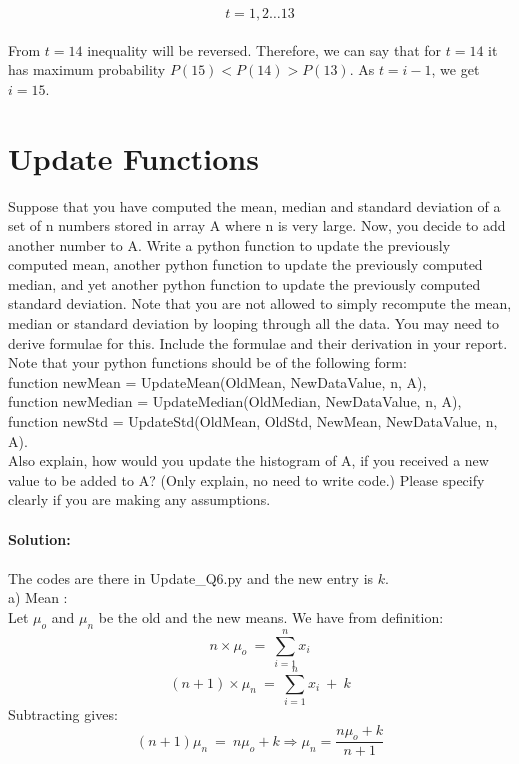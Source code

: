 \documentclass[12pt]{article}
\begin{document}
\[
t = 1,2 \dots 13
\]
\\
From $t=14$ inequality will be reversed.
Therefore, we can say that for $t = 14$ it has maximum probability $P(15) < P(14) > P(13)$.
As $t = i-1$, we get $i = 15$.

\newpage
\section{Update Functions}
Suppose that you have computed the mean, median and standard deviation of a set of n numbers
stored in array A where n is very large. Now, you decide to add another number to A. Write a
python function to update the previously computed mean, another python function to update the
previously computed median, and yet another python function to update the previously computed
standard deviation. Note that you are not allowed to simply recompute the mean, median or
standard deviation by looping through all the data. You may need to derive formulae for this.
Include the formulae and their derivation in your report. Note that your python functions should
be of the following form: \\
function newMean = UpdateMean(OldMean, NewDataValue, n, A), \\
function newMedian = UpdateMedian(OldMedian, NewDataValue, n, A),\\
function newStd = UpdateStd(OldMean, OldStd, NewMean, NewDataValue, n, A).\\
Also explain, how would you update the histogram of A, if you received a new value to be added to
A? (Only explain, no need to write code.) Please specify clearly if you are making any assumptions.\\ \\
\textbf{Solution: } \\ \\ The codes are there in Update\_Q6.py and the new entry is $k$.\\
a) Mean : \\
Let $\mu_o$ and $\mu_n$ be the old and the new means.
We have from definition: 
\begin{equation*}
    n\times\mu_o\ =\ \sum_{i=1}^{n}x_i
\end{equation*}
\begin{equation*}
        (n+1)\times\mu_n\ =\ \sum_{i=1}^{n}x_i\ +\ k
\end{equation*}
Subtracting gives:
\begin{equation*}
    (n+1)\mu_n\ =\ n\mu_o + k \Rightarrow \mu_n = \frac{n\mu_o+k}{n+1}
\end{equation*}
\end{document}
